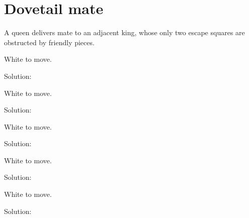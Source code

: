 \documentclass{book}
\begin{document}
\section{Dovetail mate}
A queen delivers mate to an adjacent king, whose only two escape squares are obstructed by friendly pieces.\begin{multicols}{2} 
\begin{samepage} 
\newgame 


 
\showboard
 
 White to move. 
 
Solution: 
 
\end{samepage}\begin{samepage} 
\newgame 


 
\showboard
 
 White to move. 
 
Solution: 
 
\end{samepage}\begin{samepage} 
\newgame 


 
\showboard
 
 White to move. 
 
Solution: 
 
\end{samepage}\begin{samepage} 
\newgame 


 
\showboard
 
 White to move. 
 
Solution: 
 
\end{samepage}\begin{samepage} 
\newgame 


 
\showboard
 
 White to move. 
 
Solution: 
 
\end{samepage}\end{multicols} 
\newpage 
\end{document}

